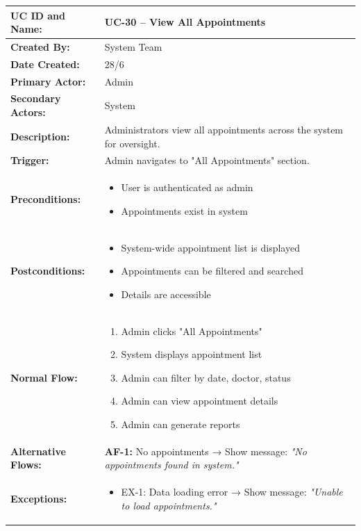 \documentclass[12pt,a4paper]{article}
\begin{document}
\renewcommand{\arraystretch}{1.5}
\begin{longtable}{|p{4.5cm}|p{10.5cm}|}
\hline
\textbf{UC ID and Name:} & UC-30 – View All Appointments \\
\hline
\textbf{Created By:} & System Team \\
\hline
\textbf{Date Created:} & 28/6 \\
\hline
\textbf{Primary Actor:} & Admin \\
\hline
\textbf{Secondary Actors:} & System \\
\hline
\textbf{Description:} & Administrators view all appointments across the system for oversight. \\
\hline
\textbf{Trigger:} & Admin navigates to "All Appointments" section. \\
\hline
\textbf{Preconditions:} &
\begin{itemize}
  \item User is authenticated as admin
  \item Appointments exist in system
\end{itemize} \\
\hline
\textbf{Postconditions:} &
\begin{itemize}
  \item System-wide appointment list is displayed
  \item Appointments can be filtered and searched
  \item Details are accessible
\end{itemize} \\
\hline
\textbf{Normal Flow:} &
\begin{enumerate}
  \item Admin clicks "All Appointments"
  \item System displays appointment list
  \item Admin can filter by date, doctor, status
  \item Admin can view appointment details
  \item Admin can generate reports
\end{enumerate} \\
\hline
\textbf{Alternative Flows:} &
\textbf{AF-1:} No appointments → Show message: \textit{"No appointments found in system."} \\
\hline
\textbf{Exceptions:} &
\begin{itemize}
  \item EX-1: Data loading error → Show message: \textit{"Unable to load appointments."}
\end{itemize} \\

\end{longtable}
\end{document}
